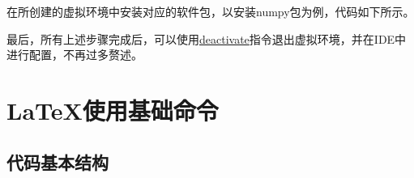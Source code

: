 \documentclass{article}
\begin{document}
\begin{enumerate}
			在所创建的虚拟环境中安装对应的软件包，以安装numpy包为例，代码如下所示。
			\begin{center}
			\end{center}
			
			最后，所有上述步骤完成后，可以使用\underline{deactivate}指令退出虚拟环境，并在IDE中进行配置，不再过多赘述。
			\end{enumerate}
	
	\section{\LaTeX 使用基础命令}
		\subsection{代码基本结构}
\end{document}
